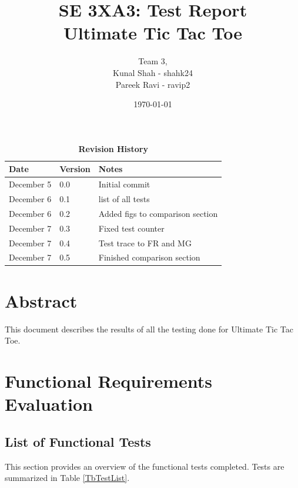\documentclass[12pt, titlepage]{article}
\title{SE 3XA3: Test Report\\Ultimate Tic Tac Toe}
\author{Team 3,
		\\ Kunal Shah - shahk24
		\\ Pareek Ravi - ravip2
}
\date{\today}
\begin{document}

\maketitle

\tableofcontents
\listoftables
\listoffigures

\newpage
\begin{table}[hp]
\caption{\bf Revision History}
\begin{tabularx}{\textwidth}{p{3cm}p{2cm}X}
\toprule {\bf Date} & {\bf Version} & {\bf Notes}\\
\midrule
December 5 & 0.0 & Initial commit\\
December 6 & 0.1 & list of all tests\\
December 6 & 0.2 & Added figs to comparison section\\
December 7 & 0.3 & Fixed test counter\\
December 7 & 0.4 & Test trace to FR and MG\\
December 7 & 0.5 & Finished comparison section\\

\bottomrule
\end{tabularx}
\end{table}

\newpage


\section*{Abstract}
This document describes the results of all the testing done for Ultimate Tic Tac Toe.

\section{Functional Requirements Evaluation}
\subsection* {List of Functional Tests}

This section provides an overview of the functional tests completed. Tests are summarized in Table \ref{TbTestList}. 
\end{document}
